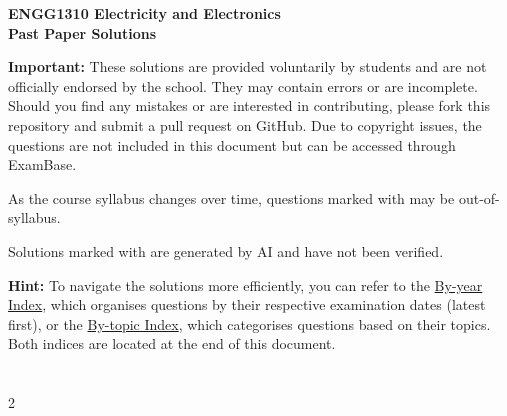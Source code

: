\documentclass[answers]{exam}
\begin{document}
\begin{center}
    {
        \Large\bfseries\sffamily ENGG1310 Electricity and Electronics
    }\\[0.75em]
    {
        \large\bfseries\sffamily Past Paper Solutions
    }
\end{center}

{
    {\bfseries\sffamily Important:}
    These solutions are provided voluntarily by students and are not officially endorsed by the school.
    They may contain errors or are incomplete.
    Should you find any mistakes or are interested in contributing, please fork this repository and submit a pull request on GitHub.
    Due to copyright issues, the questions are not included in this document but can be accessed through ExamBase.

    As the course syllabus changes over time, questions marked with \tgOutSyl may be out-of-syllabus.

    Solutions marked with \tgAI are generated by AI and have not been verified.
}

{
    {\bfseries\sffamily Hint:}
    To navigate the solutions more efficiently, you can refer to the \hyperref[index:by-year]{By-year Index}, which organises questions by their respective examination dates (latest first), or the \hyperref[index:by-topic]{By-topic Index}, which categorises questions based on their topics.
    Both indices are located at the end of this document.
}




\section*{\contentsname}
\label{index:by-year}
\begin{multicols}{2}
    \makeatletter
    \makeatother
\end{multicols}

\label{index:by-topic}
\printindex
\end{document}

